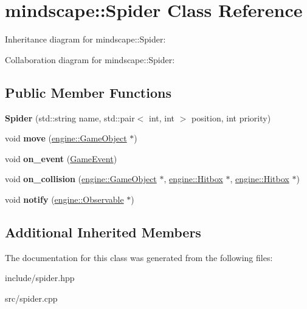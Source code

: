 \hypertarget{classmindscape_1_1_spider}{}\section{mindscape\+:\+:Spider Class Reference}
\label{classmindscape_1_1_spider}


Inheritance diagram for mindscape\+:\+:Spider\+:


Collaboration diagram for mindscape\+:\+:Spider\+:
\subsection*{Public Member Functions}
\begin{DoxyCompactItemize}
\item 
{\bfseries Spider} (std\+::string name, std\+::pair$<$ int, int $>$ position, int priority)\hypertarget{classmindscape_1_1_spider_a704f3d4f21322710c18928e0a1e9437d}{}\label{classmindscape_1_1_spider_a704f3d4f21322710c18928e0a1e9437d}

\item 
void {\bfseries move} (\hyperlink{classengine_1_1_game_object}{engine\+::\+Game\+Object} $\ast$)\hypertarget{classmindscape_1_1_spider_aff8def99a1891b772563409c1098b16e}{}\label{classmindscape_1_1_spider_aff8def99a1891b772563409c1098b16e}

\item 
void {\bfseries on\+\_\+event} (\hyperlink{class_game_event}{Game\+Event})\hypertarget{classmindscape_1_1_spider_a68e38dcd9353ec245ac984566671fd40}{}\label{classmindscape_1_1_spider_a68e38dcd9353ec245ac984566671fd40}

\item 
void {\bfseries on\+\_\+collision} (\hyperlink{classengine_1_1_game_object}{engine\+::\+Game\+Object} $\ast$, \hyperlink{classengine_1_1_hitbox}{engine\+::\+Hitbox} $\ast$, \hyperlink{classengine_1_1_hitbox}{engine\+::\+Hitbox} $\ast$)\hypertarget{classmindscape_1_1_spider_a388cb275593530dca18cf48ad68bf8ae}{}\label{classmindscape_1_1_spider_a388cb275593530dca18cf48ad68bf8ae}

\item 
void {\bfseries notify} (\hyperlink{classengine_1_1_observable}{engine\+::\+Observable} $\ast$)\hypertarget{classmindscape_1_1_spider_a4f88179ed3a8055f076fa916bf60d967}{}\label{classmindscape_1_1_spider_a4f88179ed3a8055f076fa916bf60d967}

\end{DoxyCompactItemize}
\subsection*{Additional Inherited Members}


The documentation for this class was generated from the following files\+:\begin{DoxyCompactItemize}
\item 
include/spider.\+hpp\item 
src/spider.\+cpp\end{DoxyCompactItemize}
